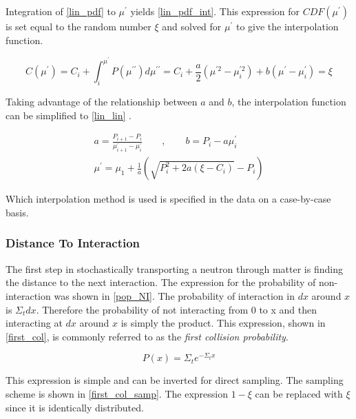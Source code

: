 Integration of \eqref{lin_pdf} to $\mu^\prime$ yields \eqref{lin_pdf_int}.  This expression for $CDF(\mu^\prime)$ is set equal to the random number $\xi$ and solved for $\mu^\prime$ to give the interpolation function.

\begin{equation}
\label{lin_pdf_int}
C(\mu^\prime) = C_i  + \int_i^{\mu^\prime} P(\mu^{\prime\prime}) d\mu^{\prime\prime}  = C_i  + \frac{a}{2}(\mu^{\prime 2}-\mu^{\prime 2}_i) + b(\mu^\prime-\mu^\prime_i) = \xi 
\end{equation}

Taking advantage of the relationship between $a$ and $b$, the interpolation function can be simplified to \eqref{lin_lin} \cite{openmc}.

\begin{equation}
\label{lin_lin}
\begin{gathered}
a = \frac{P_{i+1}-P_i}{\mu^\prime_{i+1}-\mu^\prime_i} \qquad , \qquad b = P_i - a \mu^\prime_i \\
\mu^\prime = \mu_1 + \frac{1}{a}\left( \sqrt{P^2_i + 2a(\xi -C_i)} -P_i \right)
\end{gathered}
\end{equation}

 Which interpolation method is used is specified in the data on a case-by-case basis.

\subsubsection{Distance To Interaction}

The first step in stochastically transporting a neutron through matter is finding the distance to the next interaction.  The expression for the probability of non-interaction was shown in \eqref{pop_NI}.  The probability of interaction in $dx$ around $x$ is $\Sigma_t dx$.  Therefore the probability of not interacting from 0 to x and then interacting at $dx$ around $x$ is simply the product.  This expression, shown in \eqref{first_col}, is commonly referred to as the \emph{first collision probability}.

\begin{equation}
\label{first_col}
P(x) = \Sigma_t e^{- \Sigma_t  x}
\end{equation}

This expression is simple and can be inverted for direct sampling.  The sampling scheme is shown in \eqref{first_col_samp}.  The expression $1-\xi$ can be replaced with $\xi$ since it is identically distributed.

